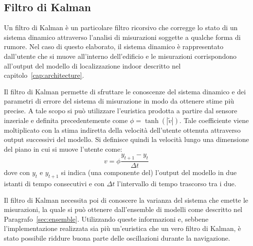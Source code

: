 \subsection{Filtro di Kalman}\label{sec:kalman}
Un filtro di Kalman è un particolare filtro ricorsivo che corregge lo stato di
un sistema dinamico attraverso l'analisi di misurazioni soggette a qualche
forma di rumore. Nel caso di questo elaborato, il sistema dinamico è
rappresentato dall'utente che si muove all'interno dell'edificio e le
misurazioni corrispondono all'output del modello di localizzazione indoor
descritto nel capitolo~\ref{cap:architecture}.

Il filtro di Kalman permette di sfruttare le conoscenze del sistema dinamico e
dei parametri di errore del sistema di misurazione in modo da ottenere stime
più precise. A tale scopo si può utilizzare l'euristica prodotta a partire dal
sensore inzeriale e definita precedentemente come \(\phi = \tanh(|\tilde{v}|)\).
Tale coefficiente viene moltiplicato con la stima indiretta della velocità
dell'utente ottenuta attraverso output successivi del modello. Si definisce
quindi la velocità lungo una dimensione del piano in cui si muove l'utente
come: \[ v = \phi \frac{y_{t+1} - y_t}{\Delta t} \] dove con \(y_t\) e
\(y_{t+1}\) si indica (una componente del) l'output del modello in due istanti
di tempo consecutivi e con \(\Delta t\) l'intervallo di tempo trascorso tra i
due.

Il filtro di Kalman necessita poi di conoscere la varianza del sistema che
emette le misurazioni, la quale si può ottenere dall'ensemble di modelli come
descritto nel Paragrafo~\ref{sec:ensemble}. Utilizzando queste informazioni e,
sebbene l'implementazione realizzata sia più un'euristica che un vero filtro di
Kalman, è stato possibile riddure buona parte delle oscillazioni durante la
navigazione.



